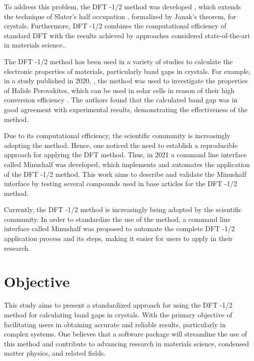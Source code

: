 \medskip

To address this problem, the DFT -1/2 method was developed \cite{doi:10.1063/1.3624562} \cite{PhysRevB.78.125116}, which extends the technique of Slater's half occupation \cite{PhysRevB.5.844}\cite{SLATER19721}, formalized by Janak's theorem, for crystals. Furthermore, DFT -1/2 combines the computational efficiency of standard DFT with the results achieved by approaches considered state-of-the-art in materials science.\cite{Pela_2015}.  

\medskip

The DFT -1/2 method has been used in a variety of studies to calculate the electronic properties of materials, particularly band gaps in crystals. For example, in a study published in 2020, \cite{doi:10.1021/acs.jpcc.0c03672}, the method was used to investigate the properties of Halide Perovskites, which can be used in solar cells in reason of their high conversion efficiency \cite{SollarCellEff}. The authors found that the calculated band gap was in good agreement with experimental results, demonstrating the effectiveness of the method.

\medskip
Due to its computational efficiency, the scientific community is increasingly adopting the method. Hence, one noticed the need to establish a reproducible approach for applying the DFT method. Thus, in 2021 a command line interface called Minushalf was developed, which implements and automates the application of the DFT -1/2 method. This work aims to describe and validate the Minushalf interface by testing several compounds used in base articles for the DFT -1/2 method.


\medskip

Currently, the DFT -1/2 method is increasingly being adopted by the scientific community. In order to standardize the use of the method, a command line interface called Minushalf was proposed to automate the complete DFT -1/2 application process and its steps, making it easier for users to apply in their research.

\section{Objective}
This study aims to present a standardized approach for using the DFT -1/2 method for calculating band gaps in crystals. With the primary objective of facilitating users in obtaining accurate and reliable results, particularly in complex systems. One believes that a software package will streamline the use of this method and contribute to advancing research in materials science, condensed matter physics, and related fields.


